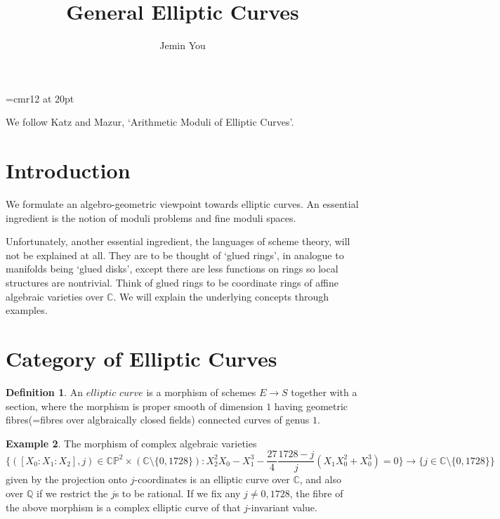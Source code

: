 \documentclass[a4paper,11pt]{article}
\begin{document}
\theoremstyle{plain}
\newtheorem{thm}{Theorem}[section]
\newtheorem{prp}[thm]{Proposition}
\newtheorem{lem}[thm]{Lemma}

\theoremstyle{definition}
\newtheorem{defn}[thm]{Definition}
\newtheorem{exm}[thm]{Example}
\newtheorem{nota}[thm]{Notation}

\theoremstyle{remark}
\newtheorem{rem}[thm]{Remark}



\font\myfont=cmr12 at 20pt

\title{\vspace{-5ex} \myfont General Elliptic Curves}
\author{Jemin You}
\date{\vspace{-5ex}}
\maketitle

\setcounter{section}{-1}

We follow Katz and Mazur, `Arithmetic Moduli of Elliptic Curves'.

\section{Introduction}

We formulate an algebro-geometric viewpoint towards elliptic curves.
An essential ingredient is the notion of moduli problems and fine moduli spaces.

Unfortunately, another essential ingredient, the languages of scheme theory, will not be explained at all.
They are to be thought of `glued rings', in analogue to manifolds being `glued disks', except there are less functions on rings so local structures are nontrivial.
Think of glued rings to be coordinate rings of affine algebraic varieties over $\mathbb{C}$.
We will explain the underlying concepts through examples.

\section{Category of Elliptic Curves}
\begin{defn}
An $\textit{elliptic curve}$ is a morphism of schemes $E\to$$S$ together with a section, where the morphism is proper smooth of dimension $1$ having geometric fibres(=fibres over algbraically closed fields) connected curves of genus $1$.
\end{defn}

\begin{exm}
The morphism of complex algebraic varieties
\[
\{([X_0:X_1:X_2],j) \in \mathbb{CP}^2\times(\mathbb{C}\setminus\{0,1728\}):X_2^2X_0-X_1^3-\frac{27}{4}\frac{1728-j}{j}(X_1X_0^2+X_0^3)=0\} \to \{j \in \mathbb{C} \setminus \{0,1728\}\}
\]
given by the projection onto $j$-coordinates is an elliptic curve over $\mathbb{C}$, and also over $\mathbb{Q}$ if we restrict the $j$s to be rational.
If we fix any $j\neq0,1728$, the fibre of the above morphism is a complex elliptic curve of that $j$-invariant value.
\end{exm}
\end{document}
